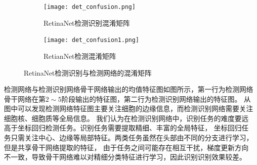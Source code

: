 \begin{table}[htbp]   
  \caption{RetinaNet网络各类别的准确率与召回率}      
  \centering    
  \label{table:cell_cls}
  \centering  
\end{table}

\begin{figure}[htbp]                  
  \centering                   
	\begin{subfigure}{0.48\linewidth}
		\centering
    \texttt{[image: det\_confusion.png]}                   
    \caption{RetinaNet检测识别混淆矩阵}
	\end{subfigure}
	\begin{subfigure}{0.48\linewidth}
		\centering
		\texttt{[image: det\_confusion1.png]}
    \caption{RetianNet检测混淆矩阵}
	\end{subfigure}
  \caption{RetinaNet检测识别与检测网络的混淆矩阵}                   
  \label{fig:det_confusion}      
\end{figure}   

检测网络与检测识别网络骨干网络输出的均值特征图如图所示，第一行为检测网络骨干网络在第$2\sim 5$阶段输出的特征图，第二行为检测识别网络输出的特征图。
从图中可以发现检测网络特征图主要关注细胞的边缘信息，而检测识别网络需要关注细胞核、细胞质等全局信息。
我们认为在检测识别网络中，识别任务的难度要远高于坐标回归检测任务。识别任务需要提取精细、丰富的全局特征，
坐标回归任务只需关注中心、边缘等局部特征。两类任务虽然在头部由不同的分支进行学习，但是共享骨干网络提取的特征，
由于任务之间可能存在相互干扰，梯度更新方向不一致，导致骨干网络难以对精细分类特征进行学习，因此识别识别效果较差。

